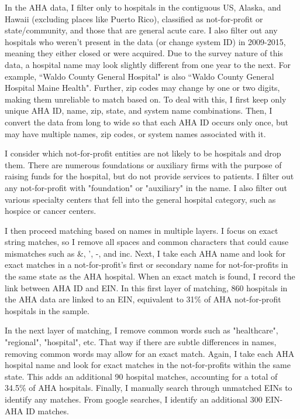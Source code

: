 \documentclass[12pt]{article}
\begin{document}
In the AHA data, I filter only to hospitals in the contiguous US, Alaska, and Hawaii (excluding places like Puerto Rico), classified as not-for-profit or state/community, and those that are general acute care. I also filter out any hospitals who weren't present in the data (or change system ID) in 2009-2015, meaning they either closed or were acquired. Due to the survey nature of this data, a hospital name may look slightly different from one year to the next. For example, ``Waldo County General Hospital" is also ``Waldo County General Hospital Maine Health". Further, zip codes may change by one or two digits, making them unreliable to match based on. To deal with this, I first keep only unique AHA ID, name, zip, state, and system name combinations. Then, I convert the data from long to wide so that each AHA ID occurs only once, but may have multiple names, zip codes, or system names associated with it.

I consider which not-for-profit entities are not likely to be hospitals and drop them. There are numerous foundations or auxiliary firms with the purpose of raising funds for the hospital, but do not provide services to patients. I filter out any not-for-profit with "foundation" or "auxiliary" in the name. I also filter out various specialty centers that fell into the general hospital category, such as hospice or cancer centers. 

I then proceed matching based on names in multiple layers. I focus on exact string matches, so I remove all spaces and common characters that could cause mismatches such as \&, ', -, and inc. Next, I take each AHA name and look for exact matches in a not-for-profit's first or secondary name for not-for-profits in the same state as the AHA hospital. When an exact match is found, I record the link between AHA ID and EIN. In this first layer of matching, 860 hospitals in the AHA data are linked to an EIN, equivalent to 31\% of AHA not-for-profit hospitals in the sample. 

In the next layer of matching, I remove common words such as "healthcare", "regional", "hospital", etc. That way if there are subtle differences in names, removing common words may allow for an exact match. Again, I take each AHA hospital name and look for exact matches in the not-for-profits within the same state. This adds an additional 90 hospital matches, accounting for a total of 34.5\% of AHA hospitals. Finally, I manually search through unmatched EINs to identify any matches. From google searches, I identify an additional 300 EIN-AHA ID matches.
\end{document}

